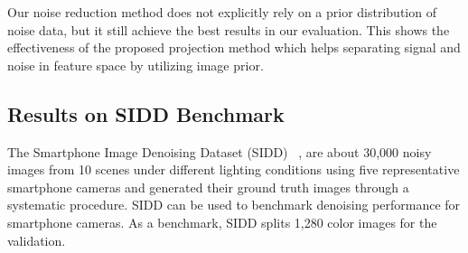 \documentclass[final]{cvpr}
\newcommand{\remove}[1]{}
\begin{document}
Our noise reduction method does not explicitly rely on a prior distribution of noise
data, but it still achieve the best results in our evaluation. This shows the effectiveness
of the proposed projection method which helps separating signal and noise in feature space
by utilizing image prior.

\remove{
We evaluate our approach on synthetic noise data in this section. Similar to [\cite{YueYZM019}], we used training data included 432 images from BSD [\cite{}], 400 images from the validation set of ImageNet [] and 4744 images from The Waterloo
Exploration Database [] to train our network. For evaluation, Set5, LIVE1 and BSD68 in [] were adopted as test data. Following [], we generate the non-i.i.d. Gaussian noise as:

where  is a spatial variant mask. Four types of masks are generated, one for training and three for testing. Based on this noise synthesis approach, the generalization ability of the model is widely explored.

VDN trains a network by generating noisy images following equation~\eqref{eqn:noniid} via assuming that training data are under a non. i.i.d. Gaussian distribution. Then VDN is tested on both i.i.d. and non-i.i.d. datasets separately. 

Folllowing VDN, for non-i.i.d testing data, Table~\ref{tab:psnr_noniid} illustrates the results. We then evaluate the performance of our method on additive Gaussian white noise (i.i.d.) with various levels (  = 15, 25, 50) of AWGN. Table~\ref{tab:psnr_iidgauss} lists the average PSNR results. Our model does not rely on a prior distribution of training data, however, better results are achieved compared to VDN. 

Our method obtains the best performance, demonstrating the ability to handle many different types of noise.
}






\subsection{Results on SIDD Benchmark}
\label{sec4.3}


The Smartphone Image Denoising Dataset (SIDD)~\cite{abdelhamed2018high} , are about 30,000 noisy images from 10 scenes under different lighting conditions using five representative smartphone cameras and generated their ground truth images through a systematic procedure. SIDD can be used to benchmark denoising performance for smartphone cameras. As a benchmark, SIDD splits 1,280 color images for the validation.
\end{document}
